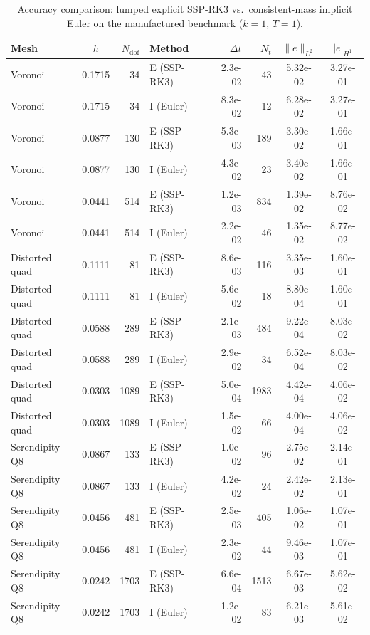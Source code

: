 \documentclass{article}
\begin{document}
\begin{table}[H]
    \centering
    \caption{Accuracy comparison: lumped explicit SSP-RK3 vs.\ consistent-mass implicit Euler on the manufactured benchmark ($k=1$, $T=1$).}\label{tab:accuracy}
    \begin{tabular}{l c r l r r c c}
    \toprule
    Mesh & $h$ & $N_{\mathrm{dof}}$ & Method & $\Delta t$ & $N_t$ & $\|e\|_{L^2}$ & $|e|_{H^1}$ \\
    \midrule
    Voronoi & 0.1715 & 34 & E (SSP-RK3) & 2.3e-02 & 43 & 5.32e-02 & 3.27e-01 \\
    Voronoi & 0.1715 & 34 & I (Euler) & 8.3e-02 & 12 & 6.28e-02 & 3.27e-01 \\
    Voronoi & 0.0877 & 130 & E (SSP-RK3) & 5.3e-03 & 189 & 3.30e-02 & 1.66e-01 \\
    Voronoi & 0.0877 & 130 & I (Euler) & 4.3e-02 & 23 & 3.40e-02 & 1.66e-01 \\
    Voronoi & 0.0441 & 514 & E (SSP-RK3) & 1.2e-03 & 834 & 1.39e-02 & 8.76e-02 \\
    Voronoi & 0.0441 & 514 & I (Euler) & 2.2e-02 & 46 & 1.35e-02 & 8.77e-02 \\
    \addlinespace
    Distorted quad & 0.1111 & 81 & E (SSP-RK3) & 8.6e-03 & 116 & 3.35e-03 & 1.60e-01 \\
    Distorted quad & 0.1111 & 81 & I (Euler) & 5.6e-02 & 18 & 8.80e-04 & 1.60e-01 \\
    Distorted quad & 0.0588 & 289 & E (SSP-RK3) & 2.1e-03 & 484 & 9.22e-04 & 8.03e-02 \\
    Distorted quad & 0.0588 & 289 & I (Euler) & 2.9e-02 & 34 & 6.52e-04 & 8.03e-02 \\
    Distorted quad & 0.0303 & 1089 & E (SSP-RK3) & 5.0e-04 & 1983 & 4.42e-04 & 4.06e-02 \\
    Distorted quad & 0.0303 & 1089 & I (Euler) & 1.5e-02 & 66 & 4.00e-04 & 4.06e-02 \\
    \addlinespace
    Serendipity Q8 & 0.0867 & 133 & E (SSP-RK3) & 1.0e-02 & 96 & 2.75e-02 & 2.14e-01 \\
    Serendipity Q8 & 0.0867 & 133 & I (Euler) & 4.2e-02 & 24 & 2.42e-02 & 2.13e-01 \\
    Serendipity Q8 & 0.0456 & 481 & E (SSP-RK3) & 2.5e-03 & 405 & 1.06e-02 & 1.07e-01 \\
    Serendipity Q8 & 0.0456 & 481 & I (Euler) & 2.3e-02 & 44 & 9.46e-03 & 1.07e-01 \\
    Serendipity Q8 & 0.0242 & 1703 & E (SSP-RK3) & 6.6e-04 & 1513 & 6.67e-03 & 5.62e-02 \\
    Serendipity Q8 & 0.0242 & 1703 & I (Euler) & 1.2e-02 & 83 & 6.21e-03 & 5.61e-02 \\
    \bottomrule
    \end{tabular}
\end{table}
\end{document}
